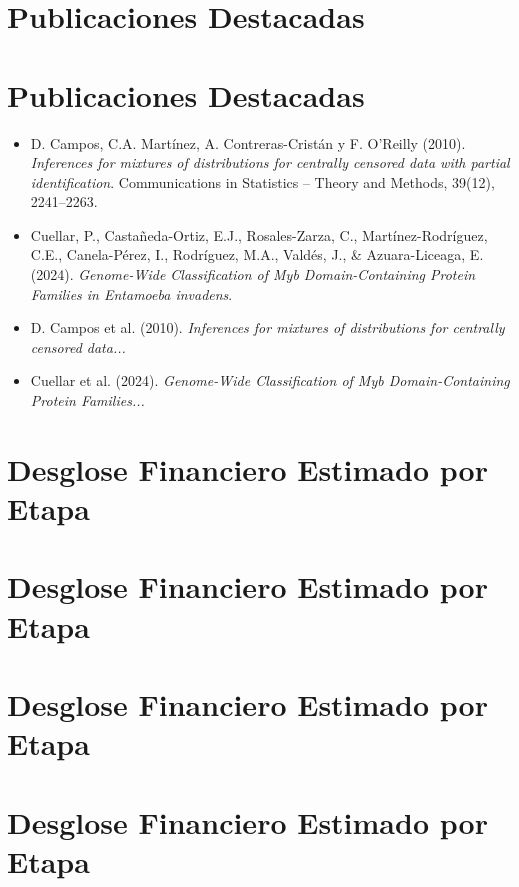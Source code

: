 \documentclass[12pt]{article}
\begin{document}
\section{Publicaciones Destacadas}

\section{Publicaciones Destacadas}
\begin{itemize}
  \item D. Campos, C.A. Martínez, A. Contreras-Cristán y F. O'Reilly (2010). \textit{Inferences for mixtures of distributions for centrally censored data with partial identification}. Communications in Statistics -- Theory and Methods, 39(12), 2241--2263.
  \item Cuellar, P., Castañeda-Ortiz, E.J., Rosales-Zarza, C., Martínez-Rodríguez, C.E., Canela-Pérez, I., Rodríguez, M.A., Valdés, J., \& Azuara-Liceaga, E. (2024). \textit{Genome-Wide Classification of Myb Domain-Containing Protein Families in Entamoeba invadens}.
\end{itemize}


\begin{itemize}
  \item D. Campos et al. (2010). \textit{Inferences for mixtures of distributions for centrally censored data...}
  \item Cuellar et al. (2024). \textit{Genome-Wide Classification of Myb Domain-Containing Protein Families...}
\end{itemize}


\section{Desglose Financiero Estimado por Etapa}

\section{Desglose Financiero Estimado por Etapa}

\section{Desglose Financiero Estimado por Etapa}

\section{Desglose Financiero Estimado por Etapa}
\end{document}
